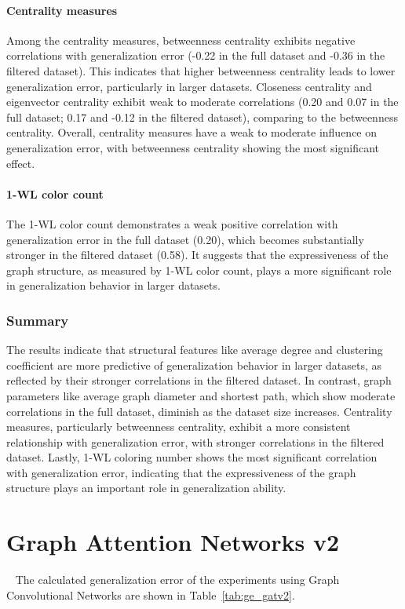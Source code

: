 \paragraph{Centrality measures}
Among the centrality measures, betweenness centrality exhibits negative correlations with generalization error (-0.22 in the full dataset and -0.36 in the filtered dataset). This indicates that higher betweenness centrality leads to lower generalization error, particularly in larger datasets. Closeness centrality and eigenvector centrality exhibit weak to moderate correlations (0.20 and 0.07 in the full dataset; 0.17 and -0.12 in the filtered dataset), comparing to the betweenness centrality. Overall, centrality measures have a weak to moderate influence on generalization error, with betweenness centrality showing the most significant effect.

\paragraph{1-WL color count}
The 1-WL color count demonstrates a weak positive correlation with generalization error in the full dataset (0.20), which becomes substantially stronger in the filtered dataset (0.58). It suggests that the expressiveness of the graph structure, as measured by 1-WL color count, plays a more significant role in generalization behavior in larger datasets.

\subsubsection{Summary}
The results indicate that structural features like average degree and clustering coefficient are more predictive of generalization behavior in larger datasets, as reflected by their stronger correlations in the filtered dataset. In contrast, graph parameters like average graph diameter and shortest path, which show moderate correlations in the full dataset, diminish as the dataset size increases. Centrality measures, particularly betweenness centrality, exhibit a more consistent relationship with generalization error, with stronger correlations in the filtered dataset. Lastly, 1-WL coloring number shows the most significant correlation with generalization error, indicating that the expressiveness of the graph structure plays an important role in generalization ability.

\section{Graph Attention Networks v2}~\label{sec:result_gatv2}
The calculated generalization error of the experiments using Graph Convolutional Networks are shown in Table~\ref{tab:ge_gatv2}.


